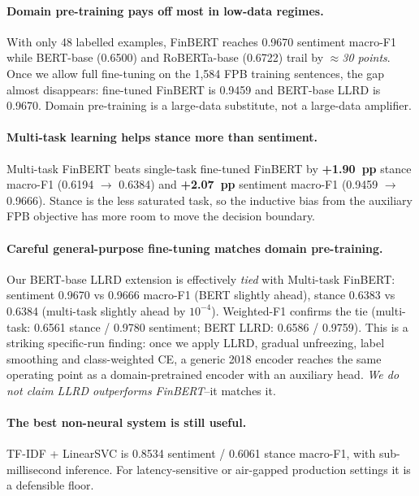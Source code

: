 \documentclass[conference, 10pt, twocolumn]{IEEEtran}
\begin{document}
\paragraph{Domain pre-training pays off most in low-data regimes.}
With only 48 labelled examples, FinBERT reaches 0.9670 sentiment macro-F1
while BERT-base (0.6500) and RoBERTa-base (0.6722) trail by
\emph{$\approx$30 points}. Once we allow full fine-tuning on the 1{,}584
FPB training sentences, the gap almost disappears: fine-tuned FinBERT is
0.9459 and BERT-base LLRD is 0.9670. Domain pre-training is a large-data
substitute, not a large-data amplifier.

\paragraph{Multi-task learning helps stance more than sentiment.}
Multi-task FinBERT beats single-task fine-tuned FinBERT by
\textbf{+1.90~pp} stance macro-F1 (0.6194 $\rightarrow$ 0.6384) and
\textbf{+2.07~pp} sentiment macro-F1 (0.9459 $\rightarrow$ 0.9666). Stance
is the less saturated task, so the inductive bias from the auxiliary FPB
objective has more room to move the decision boundary.

\paragraph{Careful general-purpose fine-tuning matches domain pre-training.} Our BERT-base LLRD extension is effectively \emph{tied}
with Multi-task FinBERT: sentiment 0.9670 vs 0.9666 macro-F1 (BERT slightly
ahead), stance 0.6383 vs 0.6384 (multi-task slightly ahead by
$10^{-4}$). Weighted-F1 confirms the tie (multi-task: 0.6561 stance /
0.9780 sentiment; BERT LLRD: 0.6586 / 0.9759). This is a striking
specific-run finding: once we apply LLRD, gradual unfreezing, label
smoothing and class-weighted CE, a generic 2018 encoder reaches the same
operating point as a domain-pretrained encoder with an auxiliary head.
\emph{We do not claim LLRD outperforms FinBERT}--it matches it.

\paragraph{The best non-neural system is still useful.}
TF-IDF + LinearSVC is 0.8534 sentiment / 0.6061 stance macro-F1, with
sub-millisecond inference. For latency-sensitive or air-gapped production
settings it is a defensible floor.

\end{document}
